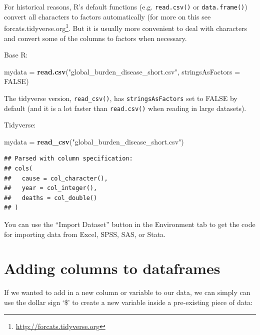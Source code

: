 \documentclass[]{book}
\makeatletter
\newenvironment{Shaded}{\begin{snugshade}}{\end{snugshade}}
\newcommand{\KeywordTok}[1]{\textcolor[rgb]{0.13,0.29,0.53}{\textbf{#1}}}
\newcommand{\DataTypeTok}[1]{\textcolor[rgb]{0.13,0.29,0.53}{#1}}
\newcommand{\DecValTok}[1]{\textcolor[rgb]{0.00,0.00,0.81}{#1}}
\newcommand{\StringTok}[1]{\textcolor[rgb]{0.31,0.60,0.02}{#1}}
\newcommand{\OtherTok}[1]{\textcolor[rgb]{0.56,0.35,0.01}{#1}}
\newcommand{\OperatorTok}[1]{\textcolor[rgb]{0.81,0.36,0.00}{\textbf{#1}}}
\newcommand{\NormalTok}[1]{#1}
\let\rmarkdownfootnote\footnote%
\def\footnote{\protect\rmarkdownfootnote}
\renewcommand{\href}[2]{#2\footnote{\url{#1}}}
\newenvironment{kframe}{%
\medskip{}
\setlength{\fboxsep}{.8em}
 \def\at@end@of@kframe{}%
 \ifinner\ifhmode%
  \def\at@end@of@kframe{\end{minipage}}%
  \begin{minipage}{\columnwidth}%
 \fi\fi%
 \def\FrameCommand##1{\hskip\@totalleftmargin \hskip-\fboxsep
 \colorbox{shadecolor}{##1}\hskip-\fboxsep
     \hskip-\linewidth \hskip-\@totalleftmargin \hskip\columnwidth}%
 \MakeFramed {\advance\hsize-\width
   \@totalleftmargin\z@ \linewidth\hsize
   \@setminipage}}%
 {\par\unskip\endMakeFramed%
 \at@end@of@kframe}
\renewenvironment{Shaded}{\begin{kframe}}{\end{kframe}}
\makeatother
\begin{document}
For historical reasons, R's default functions (e.g. \texttt{read.csv()}
or \texttt{data.frame()}) convert all characters to factors
automatically (for more on this see
\href{http://forcats.tidyverse.org}{forcats.tidyverse.org}. But it is
usually more convenient to deal with characters and convert some of the
columns to factors when necessary.

Base R:

\begin{Shaded}
\begin{Highlighting}[]
\NormalTok{mydata =}\StringTok{ }\KeywordTok{read.csv}\NormalTok{(}\StringTok{"global_burden_disease_short.csv"}\NormalTok{, }\DataTypeTok{stringsAsFactors =} \OtherTok{FALSE}\NormalTok{)}
\end{Highlighting}
\end{Shaded}

The tidyverse version, \texttt{read\_csv()}, has
\texttt{stringsAsFactors} set to FALSE by default (and it is a lot
faster than \texttt{read.csv()} when reading in large datasets).

Tidyverse:

\begin{Shaded}
\begin{Highlighting}[]
\NormalTok{mydata =}\StringTok{ }\KeywordTok{read_csv}\NormalTok{(}\StringTok{"global_burden_disease_short.csv"}\NormalTok{)}
\end{Highlighting}
\end{Shaded}

\begin{verbatim}
## Parsed with column specification:
## cols(
##   cause = col_character(),
##   year = col_integer(),
##   deaths = col_double()
## )
\end{verbatim}

You can use the ``Import Dataset'' button in the Environment tab to get
the code for importing data from Excel, SPSS, SAS, or Stata.

\section{Adding columns to
dataframes}\label{adding-columns-to-dataframes}

If we wanted to add in a new column or variable to our data, we can
simply can use the dollar sign `\$' to create a new variable inside a
pre-existing piece of data:

\begin{Shaded}
\end{Shaded}
\end{document}
